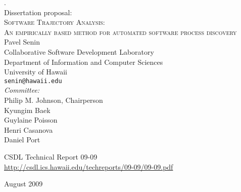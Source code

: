 \begin{titlepage}

\begin{center}

\tiny{.}\\ [1.2cm]

\Large{Dissertation proposal:} \\ [0.5cm]
\LARGE{\textsc{Software Trajectory Analysis:}} \\
\LARGE{\textsc{An empirically based method for automated software process discovery}} \\ [0.6cm]

\large{
Pavel Senin \\
Collaborative Software Development Laboratory \\
Department of Information and Computer Sciences \\
University of Hawaii \\
\texttt{senin@hawaii.edu} \\ [1.0cm]


\emph{Committee:} \\
Philip M. Johnson, Chairperson \\
Kyungim Baek \\
Guylaine Poisson \\
Henri Casanova \\
Daniel Port \\ [1.5cm]
}

\normalsize{
CSDL Technical Report 09-09 \\
\url{http://csdl.ics.hawaii.edu/techreports/09-09/09-09.pdf} \\ [1.5cm]
}

\large{August 2009}

\end{center}

\end{titlepage}
